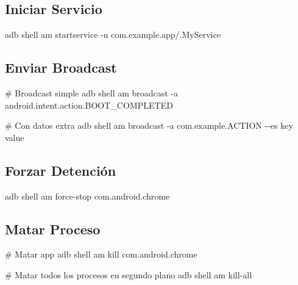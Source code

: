 \documentclass[
  doc,
  floatsintext,
  longtable,
  a4paper,
  nolmodern,
  notxfonts,
  notimes,
  12pt,
  colorlinks=true,linkcolor=blue,citecolor=blue,urlcolor=blue]{apa7}
\newenvironment{Shaded}{\begin{snugshade}}{\end{snugshade}}
\newcommand{\AttributeTok}[1]{\textcolor[rgb]{0.40,0.45,0.13}{#1}}
\newcommand{\CommentTok}[1]{\textcolor[rgb]{0.37,0.37,0.37}{#1}}
\newcommand{\ExtensionTok}[1]{\textcolor[rgb]{0.00,0.23,0.31}{#1}}
\newcommand{\NormalTok}[1]{\textcolor[rgb]{0.00,0.23,0.31}{#1}}
\begin{document}
\subsection{Iniciar Servicio}\label{iniciar-servicio}

\begin{Shaded}
\begin{Highlighting}[]
\ExtensionTok{adb}\NormalTok{ shell am startservice }\AttributeTok{{-}n}\NormalTok{ com.example.app/.MyService}
\end{Highlighting}
\end{Shaded}

\subsection{Enviar Broadcast}\label{enviar-broadcast}

\begin{Shaded}
\begin{Highlighting}[]
\CommentTok{\# Broadcast simple}
\ExtensionTok{adb}\NormalTok{ shell am broadcast }\AttributeTok{{-}a}\NormalTok{ android.intent.action.BOOT\_COMPLETED}

\CommentTok{\# Con datos extra}
\ExtensionTok{adb}\NormalTok{ shell am broadcast }\AttributeTok{{-}a}\NormalTok{ com.example.ACTION }\AttributeTok{{-}{-}es}\NormalTok{ key value}
\end{Highlighting}
\end{Shaded}

\subsection{Forzar Detención}\label{forzar-detenciuxf3n}

\begin{Shaded}
\begin{Highlighting}[]
\ExtensionTok{adb}\NormalTok{ shell am force{-}stop com.android.chrome}
\end{Highlighting}
\end{Shaded}

\subsection{Matar Proceso}\label{matar-proceso}

\begin{Shaded}
\begin{Highlighting}[]
\CommentTok{\# Matar app}
\ExtensionTok{adb}\NormalTok{ shell am kill com.android.chrome}

\CommentTok{\# Matar todos los procesos en segundo plano}
\ExtensionTok{adb}\NormalTok{ shell am kill{-}all}
\end{Highlighting}
\end{Shaded}
\end{document}

